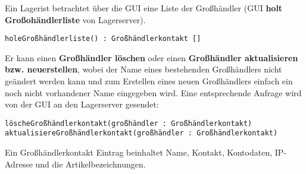 Ein Lagerist betrachtet über die GUI eine Liste der Großhändler (GUI \textbf{holt Großohändlerliste} von Lagerserver).

\texttt{holeGroßhändlerliste() : Großhändlerkontakt []}

Er kann einen \textbf{Großhändler löschen} oder einen \textbf{Großhändler aktualisieren bzw. neuerstellen}, wobei der Name eines bestehenden Großhändlers nicht geändert werden kann und zum Erstellen eines neuen Großhändlers einfach ein noch nicht vorhandener Name eingegeben wird.
Eine entsprechende Anfrage wird von der GUI an den Lagerserver gesendet:

\texttt{löscheGroßhändlerkontakt(großhändler : Großhändlerkontakt)}
\texttt{aktualisiereGroßhändlerkontakt(großhändler : Großhändlerkontakt)}

Ein Großhändlerkontakt Eintrag beinhaltet Name, Kontakt, Kontodaten, IP-Adresse und die Artikelbezeichnungen.
